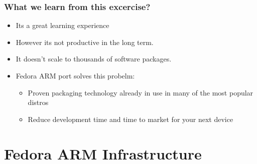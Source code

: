 \documentclass[11pt]{beamer}
\begin{document}
\begin{frame}[fragile]\frametitle{What we learn from this excercise?}
\label{sec-4.6}

\begin{itemize}

\item Its a great learning experience\\
\label{sec-4.6.1}


\item However its not productive in the long term.\\
\label{sec-4.6.2}


\item It doesn't scale to thousands of software packages.\\
\label{sec-4.6.3}


\item Fedora ARM port solves this probelm:\\
\label{sec-4.6.4}

\begin{itemize}

\item Proven packaging technology already in use in many of the most popular distros\\
\label{sec-4.6.4.1}


\item Reduce development time and time to market for your next device\\
\label{sec-4.6.4.2}


\end{itemize} %
\end{itemize} %
\end{frame}
\section{Fedora ARM Infrastructure}
\label{sec-5}
\end{document}
